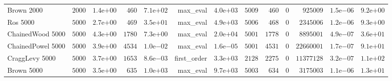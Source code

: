 \begin{longtable}[c]{lrrrrrrrrrrrr}
Brown 2000 & \( 2000\) & \( 1.4\)e\(+00\) & \(  460\) & \( 7.1\)e\(+02\) & max\_eval & \( 4.0\)e\(+03\) & \( 5009\) & \(  460\) & \(    0\) & \(925009\) & \( 1.5\)e\(-06\) & \( 9.2\)e\(+00\) \\
Ros 5000 & \( 5000\) & \( 2.7\)e\(+00\) & \(  469\) & \( 3.5\)e\(+01\) & max\_eval & \( 4.9\)e\(+03\) & \( 5006\) & \(  468\) & \(    0\) & \(2345006\) & \( 1.2\)e\(-06\) & \( 9.3\)e\(+00\) \\
ChainedWood 5000 & \( 5000\) & \( 4.3\)e\(+00\) & \( 1780\) & \( 7.3\)e\(+00\) & max\_eval & \( 2.0\)e\(+04\) & \( 5001\) & \( 1778\) & \(    0\) & \(8895001\) & \( 4.9\)e\(-07\) & \( 3.6\)e\(+01\) \\
ChainedPowel 5000 & \( 5000\) & \( 3.9\)e\(+00\) & \( 4534\) & \( 1.0\)e\(-02\) & max\_eval & \( 1.6\)e\(-05\) & \( 5001\) & \( 4531\) & \(    0\) & \(22660001\) & \( 1.7\)e\(-07\) & \( 9.1\)e\(+01\) \\
CraggLevy 5000 & \( 5000\) & \( 3.7\)e\(+00\) & \( 1653\) & \( 8.6\)e\(-03\) & first\_order & \( 3.3\)e\(+03\) & \( 2128\) & \( 2275\) & \(    0\) & \(11377128\) & \( 3.2\)e\(-07\) & \( 1.1\)e\(+02\) \\
Brown 5000 & \( 5000\) & \( 3.5\)e\(+00\) & \(  635\) & \( 1.0\)e\(+03\) & max\_eval & \( 9.7\)e\(+03\) & \( 5003\) & \(  634\) & \(    0\) & \(3175003\) & \( 1.1\)e\(-06\) & \( 1.3\)e\(+01\) \\
\hline 
\end{longtable}




